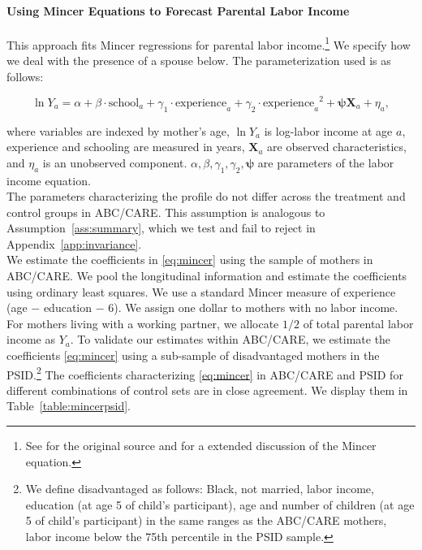 \paragraph{Using Mincer Equations to Forecast Parental Labor Income} \label{appendix:mincerpar}

\noindent This approach fits Mincer regressions for parental labor income.\footnote{See \citet{Mincer_1974_schooling} for the original source and \citet{Heckman_Lochner_ea_2006_HEE} for a extended discussion of the Mincer equation.} We specify how we deal with the presence of a spouse below. The parameterization used is as follows:

\begin{equation}
\ln Y_{a} = \alpha + \beta \cdot \text{school}_{a} + \gamma_{1}  \cdot \text{experience}_{a} + \gamma_{2} \cdot {\text{experience}_{a}}^2 + \bm{\psi} \mathbf{X}_{a} + \eta_{a}, \label{eq:mincer}
\end{equation}

\noindent where variables are indexed by mother's age, $\ln Y_a$ is log-labor income at age $a$, experience and schooling are measured in years, $ \mathbf{X}_{a}$ are observed characteristics, and $\eta_{a}$ is an unobserved component. $\alpha, \beta, \gamma_{1}, \gamma_{2}, \bm{\psi}$ are parameters of the labor income equation. \\

\noindent The parameters characterizing the profile do not differ across the treatment and control groups in ABC/CARE. This assumption is analogous to Assumption~\ref{ass:summary}, which we test and fail to reject in Appendix~\ref{app:invariance}.\\

\noindent We estimate the coefficients in \eqref{eq:mincer} using the sample of mothers in ABC/CARE. We pool the longitudinal information and estimate the coefficients using ordinary least squares. We use a standard Mincer measure of experience (age $-$ education $-$ 6). We assign one dollar to mothers with no labor income. For mothers living with a working partner, we allocate $1/2$ of total parental labor income as $Y_{a}$. To validate our estimates within ABC/CARE, we estimate the coefficients \eqref{eq:mincer} using a sub-sample of disadvantaged mothers in the PSID.\footnote{We define disadvantaged as follows: Black, not married, labor income, education (at age 5 of child's participant), age and number of children (at age 5 of child's participant) in the same ranges as the ABC/CARE mothers, labor income below the 75th percentile in the PSID sample.} The coefficients characterizing \eqref{eq:mincer} in ABC/CARE and PSID for different combinations of control sets are in close agreement. We display them in Table~\ref{table:mincerpsid}.\\

